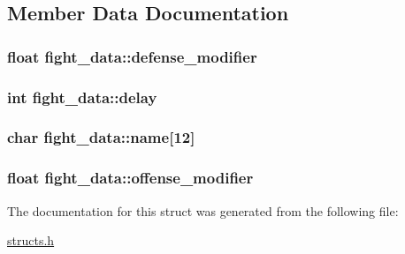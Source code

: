 \subsection{Member Data Documentation}
\hypertarget{structfight__data_adce563612a39d6998338a71465f17b52}{
\subsubsection[{defense\-\_\-modifier}]{\setlength{\rightskip}{0pt plus 5cm}float fight\-\_\-data\-::defense\-\_\-modifier}}\label{structfight__data_adce563612a39d6998338a71465f17b52}
\hypertarget{structfight__data_a666282af0f07ad22d980f4cd441415e5}{
\subsubsection[{delay}]{\setlength{\rightskip}{0pt plus 5cm}int fight\-\_\-data\-::delay}}\label{structfight__data_a666282af0f07ad22d980f4cd441415e5}
\hypertarget{structfight__data_a7071040701ede70c5947846c68f5b3a8}{
\subsubsection[{name}]{\setlength{\rightskip}{0pt plus 5cm}char fight\-\_\-data\-::name\mbox{[}12\mbox{]}}}\label{structfight__data_a7071040701ede70c5947846c68f5b3a8}
\hypertarget{structfight__data_aa869c12593bab69ec208893f05e3bd22}{
\subsubsection[{offense\-\_\-modifier}]{\setlength{\rightskip}{0pt plus 5cm}float fight\-\_\-data\-::offense\-\_\-modifier}}\label{structfight__data_aa869c12593bab69ec208893f05e3bd22}


The documentation for this struct was generated from the following file\-:\begin{DoxyCompactItemize}
\item 
\hyperlink{structs_8h}{structs.\-h}\end{DoxyCompactItemize}
